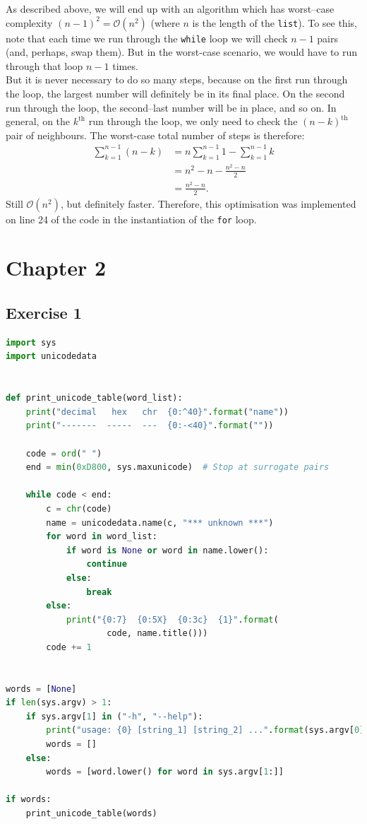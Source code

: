 \documentclass{report}
\begin{document}
As described above, we will end up with an algorithm which has worst--case complexity $\left(n-1\right)^2=\mathcal{O}\left(n^2\right)$ (where $n$ is the length of the \verb|list|). To see this, note that each time we run through the \verb|while| loop we will check $n-1$ pairs (and, perhaps, swap them). But in the worst-case scenario, we would have to run through that loop $n-1$ times.\\
\indent But it is never necessary to do so many steps, because on the first run through the loop, the largest number will definitely be in its final place. On the second run through the loop, the second--last number will be in place, and so on. In general, on the $k^{\text{th}}$ run through the loop, we only need to check the $(n-k)^{\text{th}}$ pair of neighbours. The worst-case total number of steps is therefore:
\begin{align}
\sum_{k=1}^{n-1}\left(n-k\right)&=n\sum_{k=1}^{n-1}1-\sum_{k=1}^{n-1}k\nonumber\\
&=n^2-n-\frac{n^2-n}{2}\\
&=\frac{n^2-n}{2}.\nonumber
\end{align}
Still $\mathcal{O}\left(n^2\right)$, but definitely faster. Therefore, this optimisation was implemented on line 24 of the code in the instantiation of the \verb|for| loop.
\chapter*{Chapter 2} %
\section*{Exercise 1}
\begin{lstlisting}[language=Python, style=pythonStyle]
import sys
import unicodedata


def print_unicode_table(word_list):
    print("decimal   hex   chr  {0:^40}".format("name"))
    print("-------  -----  ---  {0:-<40}".format(""))

    code = ord(" ")
    end = min(0xD800, sys.maxunicode)  # Stop at surrogate pairs

    while code < end:
        c = chr(code)
        name = unicodedata.name(c, "*** unknown ***")
        for word in word_list:
            if word is None or word in name.lower():
                continue
            else:
                break
        else:
            print("{0:7}  {0:5X}  {0:3c}  {1}".format(
                    code, name.title()))
        code += 1


words = [None]
if len(sys.argv) > 1:
    if sys.argv[1] in ("-h", "--help"):
        print("usage: {0} [string_1] [string_2] ...".format(sys.argv[0]))
        words = []
    else:
        words = [word.lower() for word in sys.argv[1:]]

if words:
    print_unicode_table(words)

\end{lstlisting}
\end{document}
